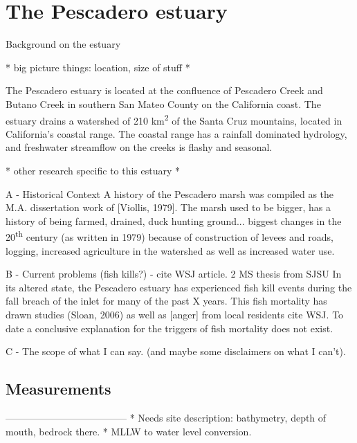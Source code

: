 \chapter{The Pescadero estuary}
\label{chPescadero}

Background on the estuary

* big picture things: location, size of stuff *

The Pescadero estuary is located at the confluence of Pescadero Creek and Butano Creek in southern San Mateo County on the California coast. The estuary drains a watershed of 210 km\textsuperscript{2} of the Santa Cruz mountains, located in California's coastal range. The coastal range has a rainfall dominated hydrology, and freshwater streamflow on the creeks is flashy and seasonal. 

* other research specific to this estuary * 



A - Historical Context
A history of the Pescadero marsh was compiled as the M.A. dissertation work of [Viollis, 1979]. The marsh used to be bigger, has a history of being farmed, drained, duck hunting ground... biggest changes in the 20\textsuperscript{th} century (as written in 1979) because of construction of levees and roads, logging, increased agriculture in the watershed as well as increased water use. 


B - Current problems (fish kills?)
- cite WSJ article. 2 MS thesis from SJSU
In its altered state, the Pescadero estuary has experienced fish kill events during the fall breach of the inlet for many of the past X years. This fish mortality has drawn studies (Sloan, 2006) as well as [anger] from local residents {cite WSJ}. To date a conclusive explanation for the triggers of fish mortality does not exist. 


C - The scope of what I can say. (and maybe some disclaimers on what I can't). 

\section{Measurements}
\label{measurementslabel}



--------------------------------------
* Needs site description: bathymetry, depth of mouth, bedrock there. 
* MLLW to water level conversion. 

